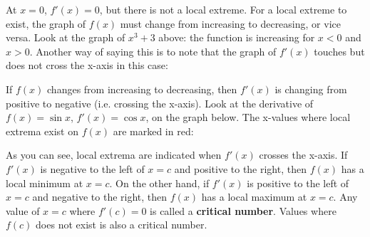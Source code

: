 At $x=0$, $f'(x)=0$, but there is not a local extreme. For a local extreme to exist, the graph of $f(x)$ must change from increasing to decreasing, or vice versa. Look at the graph of $x^3+3$ above: the function is increasing for $x<0$ and $x>0$. Another way of saying this is to note that the graph of $f'(x)$ touches but does not cross the x-axis in this case:


If $f(x)$ changes from increasing to decreasing, then $f'(x)$ is changing from positive to negative (i.e. crossing the x-axis). Look at the derivative of $f(x)=\sin{x}$, $f'(x)=\cos{x}$, on the graph below. The x-values where local extrema exist on $f(x)$ are marked in red:


As you can see, local extrema are indicated when $f'(x)$ crosses the x-axis. If $f'(x)$ is negative to the left of $x=c$ and positive to the right, then $f(x)$ has a local minimum at $x=c$. On the other hand, if $f'(x)$ is positive to the left of $x=c$ and negative to the right, then $f(x)$ has a local maximum at $x=c$. Any value of $x=c$ where $f'(c) = 0$ is called a \textbf{critical number}. Values where $f(c)$ does not exist is also a critical number. 


